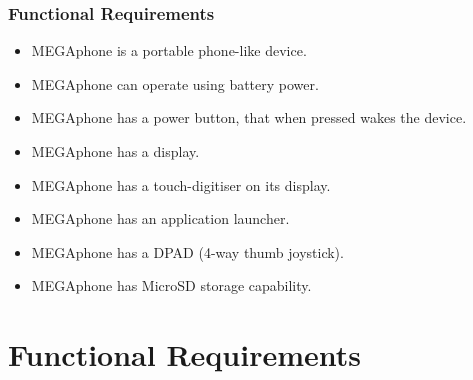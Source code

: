         \subsubsection{Functional Requirements}
        \begin{itemize}
        \item MEGAphone is a portable phone-like device.
        \item MEGAphone can operate using battery power.
        \item MEGAphone has a power button, that when pressed wakes the device.
        \item MEGAphone has a display.
        \item MEGAphone has a touch-digitiser on its display.
        \item MEGAphone has an application launcher.
        \item MEGAphone has a DPAD (4-way thumb joystick).
	\item MEGAphone has MicroSD storage capability.
        \end{itemize}

\section{Functional Requirements}
	
